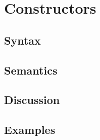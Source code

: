 \section{Constructors}

\subsection{Syntax}

\subsection{Semantics}

\subsection{Discussion}

\subsection{Examples}
